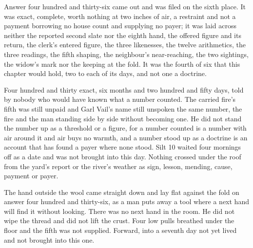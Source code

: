 Answer four hundred and thirty-six came out and was filed on the sixth place. It was exact, complete, worth nothing at two inches of air, a restraint and not a payment borrowing no house count and supplying no payer; it was laid across neither the reported second slate nor the eighth hand, the offered figure and its return, the clerk's entered figure, the three likenesses, the twelve arithmetics, the three readings, the fifth shaping, the neighbour's near-reaching, the two sightings, the widow's mark nor the keeping at the fold. It was the fourth of six that this chapter would hold, two to each of its days, and not one a doctrine.

Four hundred and thirty exact, six months and two hundred and fifty days, told by nobody who would have known what a number counted. The carried fire's fifth was still unpaid and Garl Vail's name still unspoken the same number, the fire and the man standing side by side without becoming one. He did not stand the number up as a threshold or a figure, for a number counted is a number with air around it and air buys no warmth, and a number stood up as a doctrine is an account that has found a payer where none stood. Silt 10 waited four mornings off as a date and was not brought into this day. Nothing crossed under the roof from the yard's report or the river's weather as sign, lesson, mending, cause, payment or payer.

The hand outside the wool came straight down and lay flat against the fold on answer four hundred and thirty-six, as a man puts away a tool where a next hand will find it without looking. There was no next hand in the room. He did not wipe the thread and did not lift the crust. Four low pulls breathed under the floor and the fifth was not supplied. Forward, into a seventh day not yet lived and not brought into this one.
